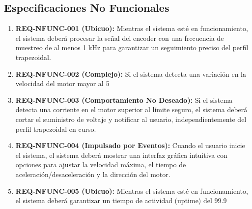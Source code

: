 \documentclass{article}
\begin{document}
\subsection*{Especificaciones No Funcionales}
\begin{enumerate}
    \item \textbf{REQ-NFUNC-001 (Ubicuo):} 
    Mientras el sistema esté en funcionamiento, el sistema deberá procesar la señal del encoder con una frecuencia de muestreo de al menos 1 kHz para garantizar un seguimiento preciso del perfil trapezoidal.

    \item \textbf{REQ-NFUNC-002 (Complejo):} 
    Si el sistema detecta una variación en la velocidad del motor mayor al 5%

    \item \textbf{REQ-NFUNC-003 (Comportamiento No Deseado):} 
    Si el sistema detecta una corriente en el motor superior al límite seguro, el sistema deberá cortar el suministro de voltaje y notificar al usuario, independientemente del perfil trapezoidal en curso.

    \item \textbf{REQ-NFUNC-004 (Impulsado por Eventos):} 
    Cuando el usuario inicie el sistema, el sistema deberá mostrar una interfaz gráfica intuitiva con opciones para ajustar la velocidad máxima, el tiempo de aceleración/desaceleración y la dirección del motor.

    \item \textbf{REQ-NFUNC-005 (Ubicuo):} 
    Mientras el sistema esté en funcionamiento, el sistema deberá garantizar un tiempo de actividad (uptime) del 99.9%
\end{enumerate}
\end{document}
